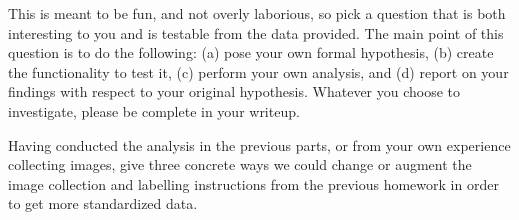 \documentclass[preview]{standalone}
\begin{document}
\begin{Parts}
This is meant to be fun, and not overly laborious, so pick a question that is both interesting to you and is testable from the data provided. The main point of this question is to do the following: (a) pose your own formal hypothesis, (b) create the functionality to test it, (c) perform your own analysis, and (d) report on your findings with respect to your original hypothesis. Whatever you choose to investigate, please be complete in your writeup.

\Part Having conducted the analysis in the previous parts, or from your own experience collecting images, give three concrete ways we could change or augment the image collection and labelling instructions from the previous homework in order to get more standardized data. 

 \end{Parts}
\end{document}
